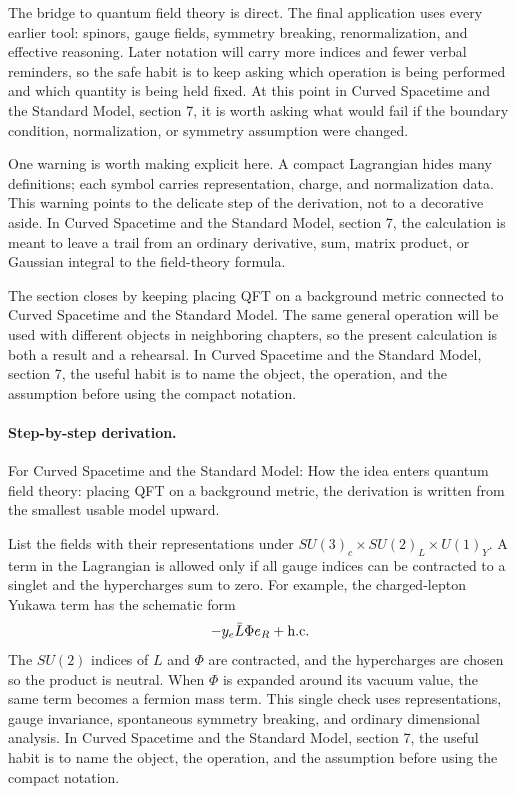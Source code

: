 The bridge to quantum field theory is direct.  The final application uses every earlier tool: spinors, gauge fields, symmetry breaking, renormalization, and effective reasoning.  Later notation will carry more indices and fewer verbal reminders, so the safe habit is to keep asking which operation is being performed and which quantity is being held fixed.  At this point in Curved Spacetime and the Standard Model, section 7, it is worth asking what would fail if the boundary condition, normalization, or symmetry assumption were changed.

One warning is worth making explicit here.  A compact Lagrangian hides many definitions; each symbol carries representation, charge, and normalization data.  This warning points to the delicate step of the derivation, not to a decorative aside.  In Curved Spacetime and the Standard Model, section 7, the calculation is meant to leave a trail from an ordinary derivative, sum, matrix product, or Gaussian integral to the field-theory formula.

The section closes by keeping placing QFT on a background metric connected to Curved Spacetime and the Standard Model.  The same general operation will be used with different objects in neighboring chapters, so the present calculation is both a result and a rehearsal.  In Curved Spacetime and the Standard Model, section 7, the useful habit is to name the object, the operation, and the assumption before using the compact notation.



\paragraph{Step-by-step derivation.}

For Curved Spacetime and the Standard Model: How the idea enters quantum field theory: placing QFT on a background metric, the derivation is written from the smallest usable model upward.

List the fields with their representations under \(SU(3)_c\times SU(2)_L\times U(1)_Y\).  A term in the Lagrangian is allowed only if all gauge indices can be contracted to a singlet and the hypercharges sum to zero.  For example, the charged-lepton Yukawa term has the schematic form
\[
  -y_e\bar L\Phi e_R+\hbox{h.c.}
\]
The \(SU(2)\) indices of \(L\) and \(\Phi\) are contracted, and the hypercharges are chosen so the product is neutral.  When \(\Phi\) is expanded around its vacuum value, the same term becomes a fermion mass term.  This single check uses representations, gauge invariance, spontaneous symmetry breaking, and ordinary dimensional analysis.  In Curved Spacetime and the Standard Model, section 7, the useful habit is to name the object, the operation, and the assumption before using the compact notation.

